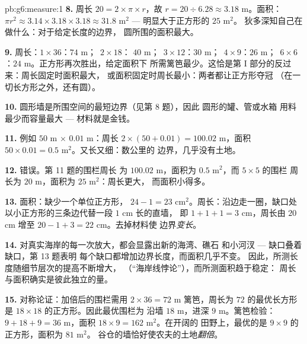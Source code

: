 \begin{solution}{pb:g6:measure:1}
\textbf{8.} 周长 $20 = 2 \times \pi \times r$，故
$r = 20 \div 6.28 \approx 3.18$ m。面积：
$\pi r^2 \approx 3.14 \times 3.18 \times 3.18 \approx
31.8$ m$^2$ --- 明显大于正方形的 $25$ m$^2$。
狄多深知自己在做什么：对于给定长度的边界，
圆所围的面积最大。

\textbf{9.} 周长：$1 \times 36$：$74$ m；\ $2 \times 18$：
$40$ m；\ $3 \times 12$：$30$ m；\ $4 \times 9$：$26$ m；\
$6 \times 6$：$24$ m。正方形再次胜出，给定面积下
所需篱笆最少。这恰是第 I 部分的反过来：周长固定时面积最大，
或面积固定时周长最小：两者都让正方形夺冠
（在一切长方形之外，还有圆）。

\textbf{10.} 圆形墙是所围空间的最短边界（见第 8 题），因此
圆形的罐、管或水箱
用料最少而容量最大 --- 材料就是金钱。

\textbf{11.} 例如 $50$ m $\times$ $0.01$ m：周长
$2 \times (50 + 0.01) = 100.02$ m，面积
$50 \times 0.01 = 0.5$ m$^2$。又长又细：数公里的
边界，几乎没有土地。

\textbf{12.} 错误。第 11 题的围栏周长
为 $100.02$ m，面积为 $0.5$ m$^2$，而 $5 \times 5$ 的围栏
周长为 $20$ m，面积为 $25$ m$^2$：周长更大，
而面积小得多。

\textbf{13.} 面积：缺少一个单位正方形，
$24 - 1 = 23$ cm$^2$。周长：沿边走一圈，缺口处
以小正方形的三条边代替一段 $1$ cm 长的直墙，
即 $1 + 1 + 1 = 3$ cm，周长由 $20$ cm 增至
$20 - 1 + 3 = 22$ cm。去掉材料使
边界\emph{变长}。

\textbf{14.} 对真实海岸的每一次放大，都会显露出新的海湾、礁石
和小河汊 --- 缺口叠着缺口，第 13 题表明
每个缺口都增加边界长度，而面积几乎不变。
因此，所测长度随细节层次的提高不断增大，
（“海岸线悖论”），而所测面积趋于稳定：
周长与面积确实是彼此独立的量。

\textbf{15.} 对称论证：加倍后的围栏需用
$2 \times 36 = 72$ m 篱笆，周长为
$72$ 的最优长方形是 $18 \times 18$ 的正方形。因此最优围栏为
沿墙 $18$ m，进深 $9$ m。篱笆检验：
$9 + 18 + 9 = 36$ m，面积 $18 \times 9 = 162$ m$^2$。在开阔的
田野上，最优的是 $9 \times 9$ 的正方形，面积为 $81$ m$^2$。
谷仓的墙恰好使农夫的土地\emph{翻倍}。
\end{solution}
